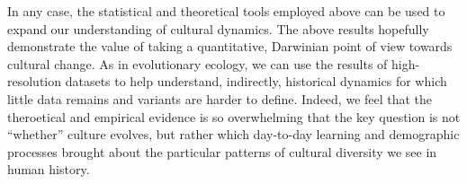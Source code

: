 In any case, the statistical and theoretical tools employed above can be used to expand our understanding of cultural dynamics.  The above results hopefully demonstrate the value of taking a quantitative, Darwinian point of view towards cultural change.  As in evolutionary ecology, we can use the results of high-resolution datasets to help understand, indirectly, historical dynamics for which little data remains and variants are harder to define.  Indeed, we feel that the theroetical and empirical evidence is so overwhelming that the key question is not ``whether'' culture evolves, but rather which day-to-day learning and demographic processes brought about the particular patterns of cultural diversity we see in human history.  
















